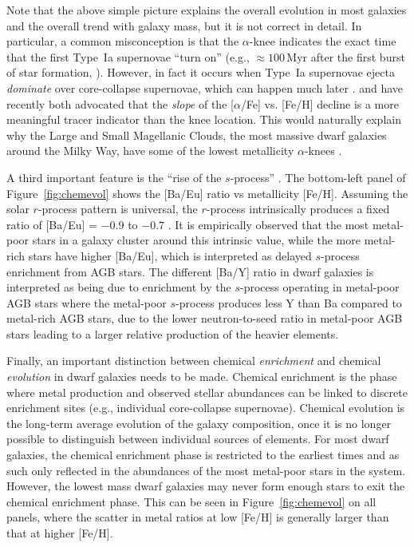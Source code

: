 \documentclass[letterpaper]{article}
\begin{document}
Note that the above simple picture explains the overall evolution in most galaxies and the overall trend with galaxy mass, but it is not correct in detail.
In particular, a common misconception is that the $\alpha$-knee indicates the exact time that the first Type~Ia supernovae ``turn on'' (e.g., ${\approx}100$\,Myr after the first burst of star formation, \citealt{maoz12}).
However, in fact it occurs when Type~Ia supernovae ejecta \emph{dominate} over core-collapse supernovae, which can happen much later \citep[e.g.,][]{Maoz2017}. \citet{Theler2020} and \citet{Kirby2020} have recently both advocated that the \emph{slope} of the [$\alpha$/Fe] vs. [Fe/H] decline is a more meaningful tracer indicator than the knee location.
This would naturally explain why the Large and Small Magellanic Clouds, the most massive dwarf galaxies around the Milky Way, have some of the lowest metallicity $\alpha$-knees \citep{Nidever2020}.

A third important feature is the ``rise of the $s$-process'' \citep[e.g.,][]{Simmerer04,Venn04}.
The bottom-left panel of Figure~\ref{fig:chemevol} shows the [Ba/Eu] ratio vs metallicity [Fe/H].
Assuming the solar $r$-process pattern is universal, the $r$-process intrinsically produces a fixed ratio of [Ba/Eu] = $-0.9$ to $-0.7$ \citep{Sneden2008}.
It is empirically observed that the most metal-poor stars in a galaxy cluster around this intrinsic value, while the more metal-rich stars have higher [Ba/Eu], which is interpreted as delayed $s$-process enrichment from AGB stars.
The different [Ba/Y] ratio in dwarf galaxies is interpreted as being due to enrichment by the $s$-process operating in metal-poor AGB stars where the metal-poor $s$-process produces less Y than Ba compared to metal-rich AGB stars, due to the lower neutron-to-seed ratio in metal-poor AGB stars \citep[e.g.,][]{Venn04,Lugaro12} leading to a larger relative production of the heavier elements.

Finally, an important distinction between chemical \emph{enrichment} and chemical \emph{evolution} in dwarf galaxies needs to be made.
Chemical enrichment is the phase where metal production and observed stellar abundances can be linked to discrete enrichment sites (e.g., individual core-collapse supernovae).
Chemical evolution is the long-term average evolution of the galaxy composition, once it is no longer possible to distinguish between individual sources of elements.
For most dwarf galaxies, the chemical enrichment phase is restricted to the earliest times and as such only reflected in the abundances of the most metal-poor stars in the system.
However, the lowest mass dwarf galaxies may never form enough stars to exit the chemical enrichment phase.
This can be seen in Figure~\ref{fig:chemevol} on all panels, where the scatter in metal ratios at low [Fe/H] is generally larger than that at higher [Fe/H].
\end{document}
